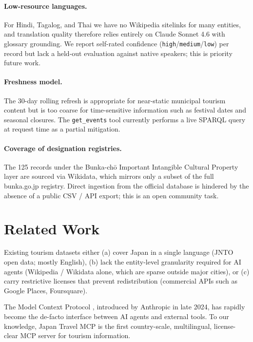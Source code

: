 \documentclass[11pt,a4paper]{article}
\begin{document}
\paragraph{Low-resource languages.} For Hindi, Tagalog, and Thai we have
no Wikipedia sitelinks for many entities, and translation quality therefore
relies entirely on Claude Sonnet 4.6 with glossary grounding. We report
self-rated confidence (\texttt{high}/\texttt{medium}/\texttt{low}) per
record but lack a held-out evaluation against native speakers; this is
priority future work.

\paragraph{Freshness model.} The 30-day rolling refresh is appropriate for
near-static municipal tourism content but is too coarse for time-sensitive
information such as festival dates and seasonal closures. The
\texttt{get\_events} tool currently performs a live SPARQL query at
request time as a partial mitigation.

\paragraph{Coverage of designation registries.} The 125 records under the
Bunka-ch\=o Important Intangible Cultural Property layer are sourced via
Wikidata, which mirrors only a subset of the full bunka.go.jp registry.
Direct ingestion from the official database is hindered by the absence of
a public CSV / API export; this is an open community task.

\section{Related Work}
\label{sec:related}

Existing tourism datasets either (a) cover Japan in a single language
(JNTO open data; mostly English), (b) lack the entity-level granularity
required for AI agents (Wikipedia / Wikidata alone, which are sparse
outside major cities), or (c) carry restrictive licenses that prevent
redistribution (commercial APIs such as Google Places, Foursquare).

The Model Context Protocol \cite{mcp-spec}, introduced by Anthropic in
late 2024, has rapidly become the de-facto interface between AI agents
and external tools. To our knowledge, Japan Travel MCP is the first
country-scale, multilingual, license-clear MCP server for tourism
information.
\end{document}
